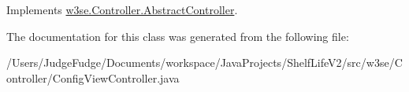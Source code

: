 Implements \hyperlink{classw3se_1_1_controller_1_1_abstract_controller_a92ee594be5083c2db0eb40286190595e}{w3se.\-Controller.\-Abstract\-Controller}.



The documentation for this class was generated from the following file\-:\begin{DoxyCompactItemize}
\item 
/\-Users/\-Judge\-Fudge/\-Documents/workspace/\-Java\-Projects/\-Shelf\-Life\-V2/src/w3se/\-Controller/Config\-View\-Controller.\-java\end{DoxyCompactItemize}
